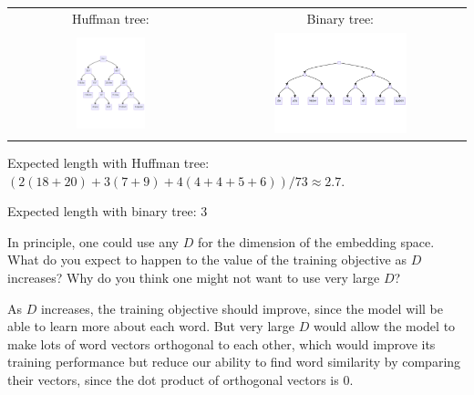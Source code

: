 \begin{solution}

	\begin{center}
		\begin{tabular}{ c c }
			Huffman tree: & Binary tree: \\
			\includegraphics[width=0.35\textwidth]{plots/3b_huffman.png} &
			\includegraphics[width=0.55\textwidth]{plots/3b_binary.png}
		\end{tabular}
	\end{center}

	Expected length with Huffman tree: $(2 (18 + 20) + 3 (7 + 9) + 4 (4 + 4 + 5 + 6)) / 73 \approx 2.7$.
	
	Expected length with binary tree: 3
\end{solution}


\problem[3]
In principle, one could use any $D$ for the dimension of the embedding space.  What do you expect to happen to the value of the training objective as $D$ increases?  Why do you think one might not want to use very large $D$?

\begin{solution}
	As $D$ increases, the training objective should improve, since the model will be able to learn more about each word.
	But very large $D$ would allow the model to make lots of word vectors orthogonal to each other, which would improve its training performance but reduce our ability to find word similarity by comparing their vectors, since the dot product of orthogonal vectors is 0.
\end{solution}

